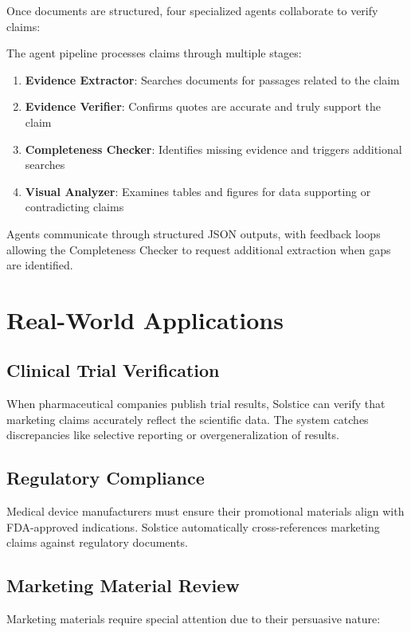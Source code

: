 \documentclass[11pt]{article}
\begin{document}
Once documents are structured, four specialized agents collaborate to verify claims:

The agent pipeline processes claims through multiple stages:

\begin{enumerate}
\item \textbf{Evidence Extractor}: Searches documents for passages related to the claim
\item \textbf{Evidence Verifier}: Confirms quotes are accurate and truly support the claim  
\item \textbf{Completeness Checker}: Identifies missing evidence and triggers additional searches
\item \textbf{Visual Analyzer}: Examines tables and figures for data supporting or contradicting claims
\end{enumerate}

Agents communicate through structured JSON outputs, with feedback loops allowing the Completeness Checker to request additional extraction when gaps are identified.

\section{Real-World Applications}

\subsection{Clinical Trial Verification}
When pharmaceutical companies publish trial results, Solstice can verify that marketing claims accurately reflect the scientific data. The system catches discrepancies like selective reporting or overgeneralization of results.

\subsection{Regulatory Compliance}
Medical device manufacturers must ensure their promotional materials align with FDA-approved indications. Solstice automatically cross-references marketing claims against regulatory documents.

\subsection{Marketing Material Review}

Marketing materials require special attention due to their persuasive nature:
\end{document}
